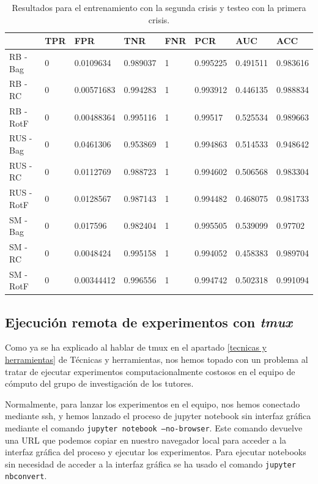 \begin{table}\scriptsize
	\begin{center}
		\begin{tabular}{llllllll}
			\toprule
			{} & TPR &         FPR &       TNR & FNR &       PCR &       AUC &       ACC \\
			\midrule
			RB - Bag                &   0 &   0.0109634 &  0.989037 &   1 &  0.995225 &  0.491511 &  0.983616 \\
			RB - RC       &   0 &  0.00571683 &  0.994283 &   1 &  0.993912 &  0.446135 &  0.988834 \\
			RB - RotF        &   0 &  0.00488364 &  0.995116 &   1 &   0.99517 &  0.525534 &  0.989663 \\
			RUS - Bag          &   0 &   0.0461306 &  0.953869 &   1 &  0.994863 &  0.514533 &  0.948642 \\
			RUS - RC &   0 &   0.0112769 &  0.988723 &   1 &  0.994602 &  0.506568 &  0.983304 \\
			RUS - RotF  &   0 &   0.0128567 &  0.987143 &   1 &  0.994482 &  0.468075 &  0.981733 \\
			SM - Bag                         &   0 &    0.017596 &  0.982404 &   1 &  0.995505 &  0.539099 &   0.97702 \\
			SM - RC                &   0 &   0.0048424 &  0.995158 &   1 &  0.994052 &  0.458383 &  0.989704 \\
			SM - RotF                 &   0 &  0.00344412 &  0.996556 &   1 &  0.994742 &  0.502318 &  0.991094 \\
			\bottomrule
		\end{tabular}
		\caption{Resultados para el entrenamiento con la segunda crisis y testeo con la primera crisis.}
		\label{tab:crisis2}
	\end{center}
\end{table}

\subsection{Ejecución remota de experimentos con \textit{tmux}}

Como ya se ha explicado al hablar de tmux en el apartado \ref{tecnicas y herramientas} de Técnicas y herramientas, nos hemos topado con un problema al tratar de ejecutar experimentos computacionalmente costosos en el equipo de cómputo del grupo de investigación de los tutores. 

Normalmente, para lanzar los experimentos en el equipo, nos hemos conectado mediante ssh, y hemos lanzado el proceso de jupyter notebook sin interfaz gráfica mediante el comando \texttt{jupyter notebook ---no-browser}. Este comando devuelve una URL que podemos copiar en nuestro navegador local para acceder a la interfaz gráfica del proceso y ejecutar los experimentos. Para ejecutar notebooks sin necesidad de acceder a la interfaz gráfica se ha usado el comando \texttt{jupyter nbconvert}. 

